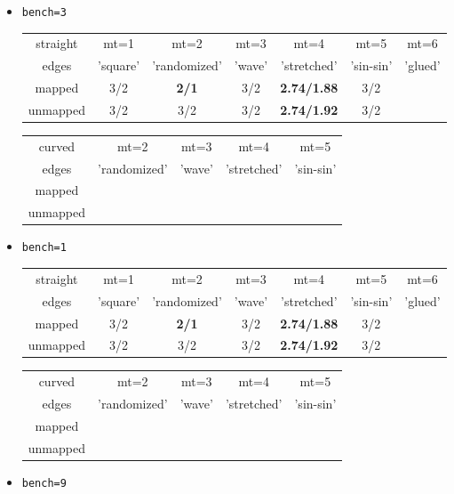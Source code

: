 \begin{itemize}

\item {\tt bench=3}

\begin{tabular}{c|cccccc}
\hline
straight& mt=1     &  mt=2        &  mt=3  &  mt=4       & mt=5  & mt=6\\
edges& 'square' & 'randomized' & 'wave' & 'stretched' & 'sin-sin' & 'glued'\\
\hline
mapped   & 3/2 & {\bf 2/1} &3/2 & {\bf 2.74/1.88} &3/2 \\
unmapped & 3/2 &3/2 &3/2 & {\bf 2.74/1.92} &3/2 \\
\hline
\end{tabular}

\begin{tabular}{c|cccc}
\hline
curved &  mt=2        &  mt=3  &  mt=4       & mt=5 \\
edges & 'randomized' & 'wave' & 'stretched' & 'sin-sin' \\
\hline
mapped   & \\ 
unmapped &  \\
\hline
\end{tabular}


\item {\tt bench=1}

\begin{tabular}{c|cccccc}
\hline
straight & mt=1     &  mt=2        &  mt=3  &  mt=4       & mt=5  & mt=6\\
edges    & 'square' & 'randomized' & 'wave' & 'stretched' & 'sin-sin' & 'glued'\\
\hline
mapped   & 3/2 & {\bf 2/1} &3/2 & {\bf 2.74/1.88} &3/2 \\
unmapped & 3/2 &3/2 &3/2 & {\bf 2.74/1.92} &3/2 \\
\hline
\end{tabular}

\begin{tabular}{c|cccc}
\hline
curved&  mt=2        &  mt=3  &  mt=4       & mt=5 \\
edges& 'randomized' & 'wave' & 'stretched' & 'sin-sin' \\
\hline
mapped   & \\ 
unmapped &  \\
\hline
\end{tabular}

\item {\tt bench=9}


\end{itemize}
